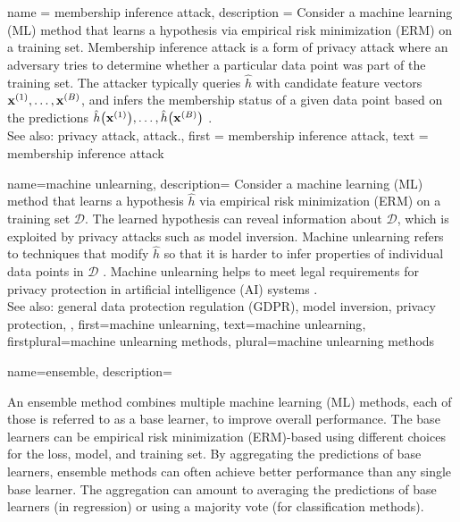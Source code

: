 {
{name = {membership inference attack}, 
 description = {Consider a machine learning (ML) method that learns a hypothesis 
                via empirical risk minimization (ERM) on a training set. Membership inference 
                attack is a form of privacy attack where an adversary tries 
				to determine whether a particular data point was part 
				of the training set. The attacker typically queries 
				$\hat{h}$ with candidate feature vectors 
				${\bf x}^{(1)},\ldots,{\bf x}^{(B)}$, 
				and infers the membership status of a given data point 
				based on the predictions $\hat{h}\big({\bf x}^{(1)}\big),\ldots,
				\hat{h}\big({\bf x}^{(B)}\big)$ \cite{Shokri2017}.\\ 
				See also: privacy attack, attack.}, 
 first = {membership inference attack}, 
 text = {membership inference attack}
}

{name={machine unlearning},
 description={
	Consider a machine learning (ML) method that learns a hypothesis $\hat{h}$ 
	via empirical risk minimization (ERM) on a training set $\mathcal{D}$. The learned hypothesis can 
	reveal information about $\mathcal{D}$, which is exploited by privacy attacks such as 
	model inversion. Machine unlearning refers to techniques that 
	modify $\hat{h}$ so that it is harder to infer properties of individual 
	data points in $\mathcal{D}$ \cite{cao2015unlearning}. Machine unlearning helps 
	to meet legal requirements for privacy protection in artificial intelligence (AI) systems \cite{GDPR2016}. \\[4pt]
	 See also: general data protection regulation (GDPR), model inversion, privacy protection, },
	first={machine unlearning},
	text={machine unlearning},
	firstplural={machine unlearning methods},
	plural={machine unlearning methods}
}

{name={ensemble}, 
	description={An ensemble method combines multiple 
		machine learning (ML) methods, each of those is referred to as a base learner, 
		to improve overall performance. The base learners can be empirical risk minimization (ERM)-based 
        using different choices for the loss, model, and training set. 
		By aggregating the predictions of base learners, ensemble methods can 
		often achieve better performance than any single base learner. The 
		aggregation can amount to averaging the predictions of base learners 
		(in regression) or using a majority vote (for classification methods). 
			\begin{figure}[htbp]
		\begin{center}
			\begin{tikzpicture}[
				scale=1.1, transform shape,
				node distance=11mm and 10mm,
				dataset/.style={draw, rounded corners, inner sep=2pt},
				learner/.style={draw, rounded corners,inner sep=2pt},
				op/.style={draw, circle, inner sep=1pt},
				flow/.style={->, >=latex},
				feedback/.style={->, >=latex, dashed, very thin},
				lab/.style={font=\scriptsize}
				]
				

\end{tikzpicture}
\end{center}
\end{figure}}}}
